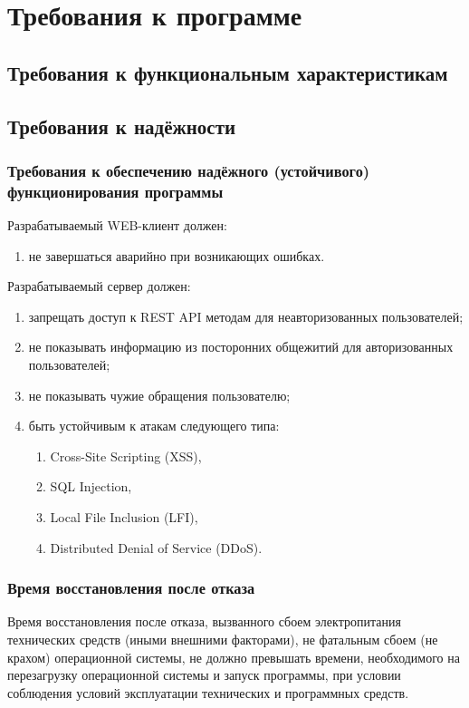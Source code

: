 \section{Требования к программе}

\subsection{Требования к функциональным характеристикам}



\subsection{Требования к надёжности}

\subsubsection{Требования к обеспечению надёжного (устойчивого) функционирования программы}

Разрабатываемый WEB-клиент должен:
\begin{enumerate}
    \item не завершаться аварийно при возникающих ошибках.
\end{enumerate}

Разрабатываемый сервер должен:
\begin{enumerate}
    \item запрещать доступ к REST API методам для неавторизованных пользователей;
    \item не показывать информацию из посторонних общежитий для авторизованных пользователей;
    \item не показывать чужие обращения пользователю;
    \item быть устойчивым к атакам следующего типа:
    \begin{enumerate}
        \item Cross-Site Scripting (XSS),
        \item SQL Injection,
        \item Local File Inclusion (LFI),
        \item Distributed Denial of Service (DDoS).
    \end{enumerate}
\end{enumerate}

\subsubsection{Время восстановления после отказа}
Время восстановления после отказа, вызванного сбоем электропитания технических средств (иными внешними факторами),
не фатальным сбоем (не крахом) операционной системы, не должно превышать времени, необходимого на перезагрузку
операционной системы и запуск программы, при условии соблюдения условий эксплуатации технических и программных средств.

